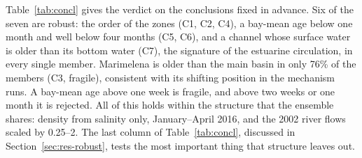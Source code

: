 \documentclass[a4paper,fleqn]{ems-dc}
\begin{document}
Table~\ref{tab:concl} gives the verdict on the conclusions fixed in advance. Six of the
seven are robust: the order of the zones (C1, C2, C4), a bay-mean age below one month and
well below four months (C5, C6), and a channel whose surface water is older than its bottom
water (C7), the signature of the estuarine circulation, in every single member. Marimelena
is older than the main basin in only 76\% of the members (C3, fragile), consistent with its
shifting position in the mechanism runs. A bay-mean age above one week is fragile, and above
two weeks or one month it is rejected. All of this holds within the structure that the
ensemble shares: density from salinity only, January--April 2016, and the 2002 river flows
scaled by 0.25--2. The last column of Table~\ref{tab:concl}, discussed in
Section~\ref{sec:res-robust}, tests the most important thing that structure leaves out.
\end{document}
